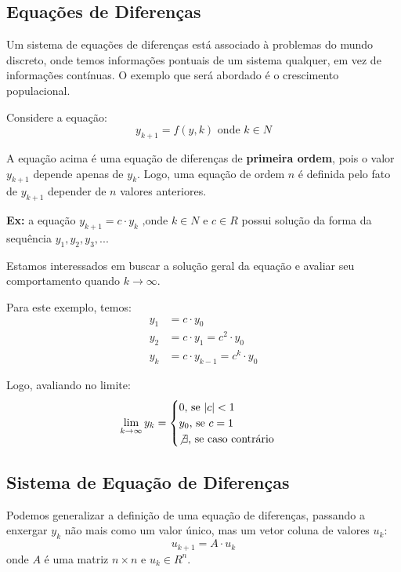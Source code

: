 \documentclass[12pt]{article}
\begin{document}
\subsection{Equações de Diferenças}

Um sistema de equações de diferenças está associado à problemas do mundo discreto, onde temos informações pontuais de um sistema qualquer, em vez de informações contínuas. O exemplo que será abordado é o crescimento populacional.

Considere a equação:
\begin{equation*}
	y_{k+1}=f(y,k)\mbox{ onde }k\in N
\end{equation*}

A equação acima é uma equação de diferenças de \textbf{primeira ordem}, pois o valor $y_{k+1}$ depende apenas de $y_k$. Logo, uma equação de ordem $n$ é definida pelo fato de $y_{k+1}$ depender de $n$ valores anteriores.

\textbf{Ex:} a equação $y_{k+1}=c\cdot y_k\mbox{ ,onde }k\in N \mbox{ e }c\in R$ possui solução da forma da sequência $y_1,y_2,y_3,...$

Estamos interessados em buscar a solução geral da equação e avaliar seu comportamento quando $k\to \infty$.

Para este exemplo, temos:
\begin{align*}
	y_1&=c\cdot y_0\\
	y_2&=c\cdot y_1=c^2\cdot y_0\\
	y_k&=c\cdot y_{k-1}=c^k\cdot y_0
\end{align*}

Logo, avaliando no limite:
\begin{equation*}
	\lim_{k\to \infty}y_k=\begin{cases}0\mbox{, se }|c|<1\\ y_0\mbox{, se }c=1\\ \not\exists\mbox{, se caso contrário} 
	\end{cases}
\end{equation*}

\subsection{Sistema de Equação de Diferenças}
Podemos generalizar a definição de uma equação de diferenças, passando a enxergar $y_k$ não mais como um valor único, mas um vetor coluna de valores $u_k$:
\begin{equation*}
	u_{k+1}=A\cdot u_k
\end{equation*}
onde $A$ é uma matriz $n\times n$ e $u_k\in R^n$.\\
\end{document}

